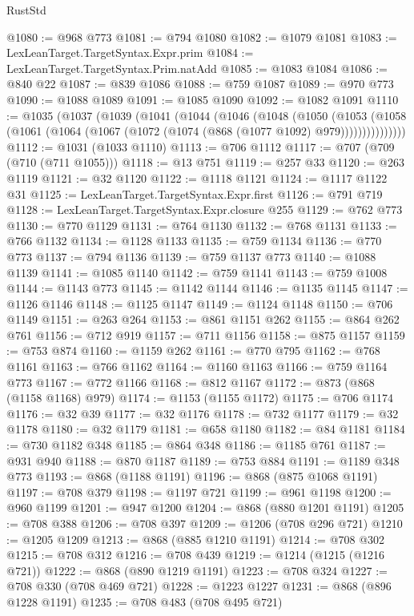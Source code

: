 \begin{lexlean}{RustStd}
\begin{coremodule}
@1080 := @968 @773
@1081 := @794 @1080
@1082 := @1079 @1081
@1083 := LexLeanTarget.TargetSyntax.Expr.prim
@1084 := LexLeanTarget.TargetSyntax.Prim.natAdd
@1085 := @1083 @1084
@1086 := @840 @22
@1087 := @839 @1086
@1088 := @759 @1087
@1089 := @970 @773
@1090 := @1088 @1089
@1091 := @1085 @1090
@1092 := @1082 @1091
@1110 := @1035
    (@1037
      (@1039
        (@1041
          (@1044
            (@1046
              (@1048
                (@1050
                  (@1053
                    (@1058
                      (@1061 (@1064 (@1067 (@1072 (@1074 (@868 (@1077 @1092) @979)))))))))))))))
@1112 := @1031 (@1033 @1110)
@1113 := @706 @1112
@1117 := @707 (@709 (@710 (@711 @1055)))
@1118 := @13 @751
@1119 := @257 @33
@1120 := @263 @1119
@1121 := @32 @1120
@1122 := @1118 @1121
@1124 := @1117 @1122 @31
@1125 := LexLeanTarget.TargetSyntax.Expr.first
@1126 := @791 @719
@1128 := LexLeanTarget.TargetSyntax.Expr.closure @255
@1129 := @762 @773
@1130 := @770 @1129
@1131 := @764 @1130
@1132 := @768 @1131
@1133 := @766 @1132
@1134 := @1128 @1133
@1135 := @759 @1134
@1136 := @770 @773
@1137 := @794 @1136
@1139 := @759 @1137 @773
@1140 := @1088 @1139
@1141 := @1085 @1140
@1142 := @759 @1141
@1143 := @759 @1008
@1144 := @1143 @773
@1145 := @1142 @1144
@1146 := @1135 @1145
@1147 := @1126 @1146
@1148 := @1125 @1147
@1149 := @1124 @1148
@1150 := @706 @1149
@1151 := @263 @264
@1153 := @861 @1151 @262
@1155 := @864 @262 @761
@1156 := @712 @919
@1157 := @711 @1156
@1158 := @875 @1157
@1159 := @753 @874
@1160 := @1159 @262
@1161 := @770 @795
@1162 := @768 @1161
@1163 := @766 @1162
@1164 := @1160 @1163
@1166 := @759 @1164 @773
@1167 := @772 @1166
@1168 := @812 @1167
@1172 := @873 (@868 (@1158 @1168) @979)
@1174 := @1153 (@1155 @1172)
@1175 := @706 @1174
@1176 := @32 @39
@1177 := @32 @1176
@1178 := @732 @1177
@1179 := @32 @1178
@1180 := @32 @1179
@1181 := @658 @1180
@1182 := @84 @1181
@1184 := @730 @1182 @348
@1185 := @864 @348
@1186 := @1185 @761
@1187 := @931 @940
@1188 := @870 @1187
@1189 := @753 @884
@1191 := @1189 @348 @773
@1193 := @868 (@1188 @1191)
@1196 := @868 (@875 @1068 @1191)
@1197 := @708 @379
@1198 := @1197 @721
@1199 := @961 @1198
@1200 := @960 @1199
@1201 := @947 @1200
@1204 := @868 (@880 @1201 @1191)
@1205 := @708 @388
@1206 := @708 @397
@1209 := @1206 (@708 @296 @721)
@1210 := @1205 @1209
@1213 := @868 (@885 @1210 @1191)
@1214 := @708 @302
@1215 := @708 @312
@1216 := @708 @439
@1219 := @1214 (@1215 (@1216 @721))
@1222 := @868 (@890 @1219 @1191)
@1223 := @708 @324
@1227 := @708 @330 (@708 @469 @721)
@1228 := @1223 @1227
@1231 := @868 (@896 @1228 @1191)
@1235 := @708 @483 (@708 @495 @721)

\end{coremodule}
\end{lexlean}
